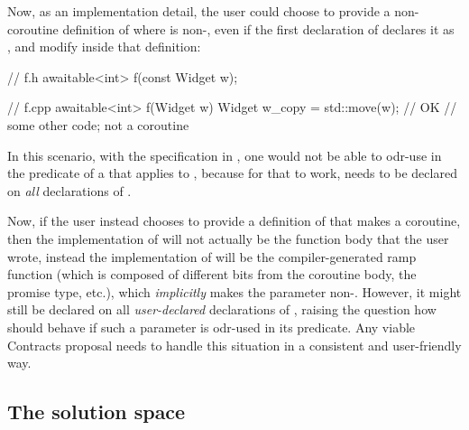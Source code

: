 Now, as an implementation detail, the user could choose to provide a non-coroutine definition of  where  is non-, even if the first declaration of  declares it as , and modify  inside that definition:
\begin{codeblock}
// f.h
awaitable<int> f(const Widget w);

// f.cpp
awaitable<int> f(Widget w) {
  Widget w_copy = std::move(w); // OK
  // some other code; not a coroutine
}
\end{codeblock}
In this scenario, with the specification in \cite{P2900R8}, one would not be able to odr-use  in the predicate of a  that applies to , because for that to work,  needs to be declared  on \emph{all} declarations of .

Now, if the user instead chooses to provide a definition of  that makes  a coroutine, then the implementation of  will not actually be the function body that the user wrote, instead the implementation of  will be the compiler-generated ramp function (which is composed of different bits from the coroutine body, the promise type, etc.), which \emph{implicitly} makes the parameter non-. However, it might still be declared  on all \emph{user-declared} declarations of , raising the question how  should behave if such a parameter is odr-used in its predicate. Any viable Contracts proposal needs to handle this situation in a consistent and user-friendly way.

\subsection{The solution space}
\label{solutions}

